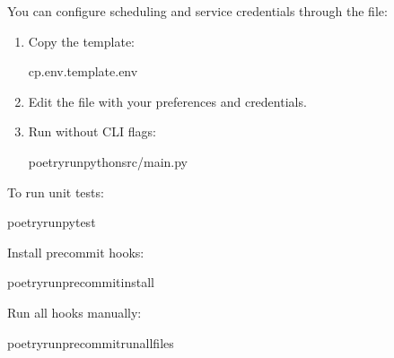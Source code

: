 \documentclass[letterpaper,10pt,english]{sphinxmanual}
\begin{document}
\sphinxAtStartPar
You can configure scheduling and service credentials through the  file:
\begin{enumerate}
%
\item {} 
\sphinxAtStartPar
Copy the template:

\begin{sphinxVerbatim}[commandchars=\\\{\}]
cp.env.template.env
\end{sphinxVerbatim}

\item {} 
\sphinxAtStartPar
Edit the file with your preferences and credentials.

\item {} 
\sphinxAtStartPar
Run without CLI flags:

\begin{sphinxVerbatim}[commandchars=\\\{\}]
poetryrunpythonsrc/main.py
\end{sphinxVerbatim}

\end{enumerate}

\sphinxAtStartPar
{}

\sphinxAtStartPar
To run unit tests:

\begin{sphinxVerbatim}[commandchars=\\\{\}]
poetryrunpytest
\end{sphinxVerbatim}

\sphinxAtStartPar
{}

\sphinxAtStartPar
Install pre\sphinxhyphen{}commit hooks:

\begin{sphinxVerbatim}[commandchars=\\\{\}]
poetryrunpre\PYGZhy{}commitinstall
\end{sphinxVerbatim}

\sphinxAtStartPar
Run all hooks manually:

\begin{sphinxVerbatim}[commandchars=\\\{\}]
poetryrunpre\PYGZhy{}commitrun\PYGZhy{}\PYGZhy{}all\PYGZhy{}files
\end{sphinxVerbatim}
\end{document}
